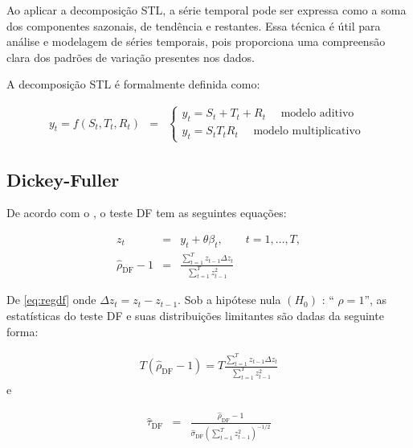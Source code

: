 
Ao aplicar a decomposição STL, a série temporal pode ser expressa como a soma dos componentes sazonais, de tendência e restantes. Essa técnica é útil para análise e modelagem de séries temporais, pois proporciona uma compreensão clara dos padrões de variação presentes nos dados.

A decomposição STL é formalmente definida como:

\begin{eqnarray}
	y_t=f\left(S_t, T_t, R_t\right)&=&\left\{\begin{array}{l}
		y_t=S_t+T_t+R_t \quad \text { modelo aditivo } \\
		y_t=S_t T_t R_t \quad \text { modelo multiplicativo }
	\end{array}\right. \label{eq:stl}
\end{eqnarray}

\subsection{Dickey-Fuller}

De acordo com o , o teste DF tem as seguintes equações:

\begin{eqnarray}
	z_t&=& y_t+\theta \beta_t, \qquad t=1,\ldots, T, \label{eq:df3}\\	
	\hat{\rho}_{\mathrm{DF}}-1&=&\frac{\sum_{t=1}^T z_{t-1} \Delta z_t}{\sum_{t=1}^T z_{t-1}^2} \label{eq:regdf}
\end{eqnarray}

De \eqref{eq:regdf} onde $\Delta z_t=z_t-z_{t-1}$. Sob a hipótese nula $\left(H_0\right)$ : `` $\rho=1$'', as estatísticas do teste DF e suas distribuições limitantes são dadas da seguinte forma:


\begin{eqnarray}
	T\left(\hat{\rho}_{\mathrm{DF}}-1\right)=T \frac{\sum_{t=1}^T z_{t-1} \Delta z_t}{\sum_{t=1}^T z_{t-1}^2}
\end{eqnarray}
e


\begin{eqnarray}
	\hat{\tau}_{\mathrm{DF}}&=&\frac{\hat{\rho}_{\mathrm{DF}}-1}{\hat{\sigma}_{\mathrm{DF}}\left(\sum_{t=1}^T z_{t-1}^2\right)^{-1 / 2}} \label{eq:df}
\end{eqnarray}

